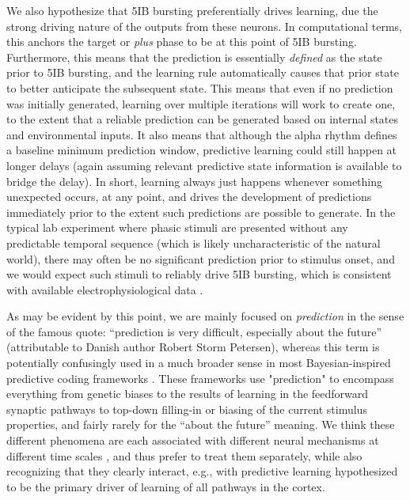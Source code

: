 \documentclass[11pt,twoside]{article}
\newif\myifpdf
\begin{document}
We also hypothesize that 5IB bursting preferentially drives learning, due the strong driving nature of the outputs from these neurons.  In computational terms, this anchors the target or \emph{plus} phase to be at this point of 5IB bursting.  Furthermore, this means that the prediction is essentially \emph{defined} as the state prior to 5IB bursting, and the learning rule automatically causes that prior state to better anticipate the subsequent state.  This means that even if no prediction was initially generated, learning over multiple iterations will work to create one, to the extent that a reliable prediction can be generated based on internal states and environmental inputs.  It also means that although the alpha rhythm defines a baseline minimum prediction window, predictive learning could still happen at longer delays (again assuming relevant predictive state information is available to bridge the delay).  In short, learning always just happens whenever something unexpected occurs, at any point, and drives the development of predictions immediately prior to the extent such predictions are possible to generate.  In the typical lab experiment where phasic stimuli are presented without any predictable temporal sequence (which is likely uncharacteristic of the natural world), there may often be no significant prediction prior to stimulus onset, and we would expect such stimuli to reliably drive 5IB bursting, which is consistent with available electrophysiological data \citep{Bender82,PetersenRobinsonKeys85,BenderYouakim01,Robinson93,SaalmannPinskWangEtAl12,KomuraNikkuniHirashimaEtAl13,ZhouSchaferDesimone16}.

As may be evident by this point, we are mainly focused on \emph{prediction} in the sense of the famous quote: ``prediction is very difficult, especially about the future'' (attributable to Danish author Robert Storm Petersen), whereas this term is potentially confusingly used in a much broader sense in most Bayesian-inspired predictive coding frameworks \citep{RaoBallard99,Friston05,deLangeHeilbronKok18}.  
These frameworks use "prediction" to encompass everything from genetic biases to the results of learning in the feedforward synaptic pathways to top-down filling-in or biasing of the current stimulus properties, and fairly rarely for the  ``about the future'' meaning.   We think these different phenomena are each associated with different neural mechanisms at different time scales \citep{OReillyWyatteHerdEtAl13,OReillyMunakataFrankEtAl12}, and thus prefer to treat them separately, while also recognizing that they clearly interact, e.g., with predictive learning hypothesized to be the primary driver of learning of all pathways in the cortex.
\end{document}
